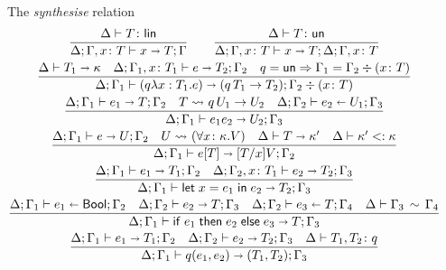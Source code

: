 \begin{figure}[h!]
  The \emph{synthesise} relation\hfill{}
  \begin{gather*}
    \frac{
      \isLin T
    }{
      \algtypeout[\kindEnv;\varEnv, x\colon T] x T \varEnv
    }
    \qquad
    \frac{
      \isUn T
    }{
      \algtypeout[\kindEnv;\varEnv, x\colon T] x T {\kindEnv;\varEnv, x\colon T}
    }
    \\
    \frac{
      \algkindout{T_1} \kind
      \quad
      \algtypeout[\kindEnv;\varEnv_1,x\colon T_1]{e}{T_2}{\varEnv_2}
      \quad
      q=\unk \Rightarrow \varEnv_1 = \varEnv_2 \div (x\colon T)
    }{
      \algtypeout[\kindEnv;\varEnv_1]{(q\lambda x:T_1.e)}{(q\,T_1 \rightarrow T_2)}{\varEnv_2 \div (x\colon T)}
    }
    \\
    \frac{
      \algtypeout[\kindEnv;\varEnv_1]{e_1}{T}{\varEnv_2}
      \quad
      T \Extract{} q\,U_1\rightarrow U_2
      \quad
      \algtypein[\kindEnv;\varEnv_2]{e_2}{U_1}{\varEnv_3}
    }{
      \algtypeout[\kindEnv;\varEnv_1]{e_1e_2}{U_2}{\varEnv_3}
    }
    \\
    \frac{
      \algtypeout[\kindEnv;\varEnv_1]{e}{U}{\varEnv_2}
      \quad
      U \Extract{} (\forall x\colon\kind.V)
      \quad
      \algkindout T {\kind'}
      \quad
      \subkind{\kind'}{\kind}
    }{
      \algtypeout[\kindEnv;\varEnv_1]{e[T]}{\subs T x V}{\varEnv_2}
    }
    \\
    \frac{
      \algtypeout[\kindEnv;\varEnv_1]{e_1}{T_1}{\varEnv_2}
      \quad
      \algtypeout[\kindEnv;\varEnv_2,x\colon T_1]{e_2}{T_2}{\Gamma_3}
    }{
      \algtypeout[\kindEnv;\varEnv_1]{\unlete{x}{e_1}{e_2}}{T_2}{\varEnv_3}
    }
    \\
    \frac{
      \algtypein[\kindEnv;\varEnv_1]{e_1}{\boole}{\varEnv_2}
      \quad
      \algtypeout[\kindEnv;\varEnv_2]{e_2}{T}{\varEnv_3}
      \quad
      \algtypein[\kindEnv;\varEnv_2]{e_3}{T}{\varEnv_4}
      \quad
      \ctxequiv{\varEnv_3}{\varEnv_4}
    }{
      \algtypeout[\kindEnv;\varEnv_1]{\conditionale{e_1}{e_2}{e_3}}{T}{\varEnv_3}
    }
    \\
    \frac{
      \algtypeout[\kindEnv ; \varEnv_1]{e_1}{T_1}{\varEnv_2}
      \quad
      \algtypeout[\kindEnv ; \varEnv_2]{e_2}{T_2}{\varEnv_3}
      \quad
      \isqualifier{T_1,T_2}{q}
    }{
      \algtypeout[\kindEnv ; \varEnv_1]{q(e_1, e_2)}{(T_1,T_2)}{\varEnv_3}
    }
    \\

\end{gather*}
\end{figure}
